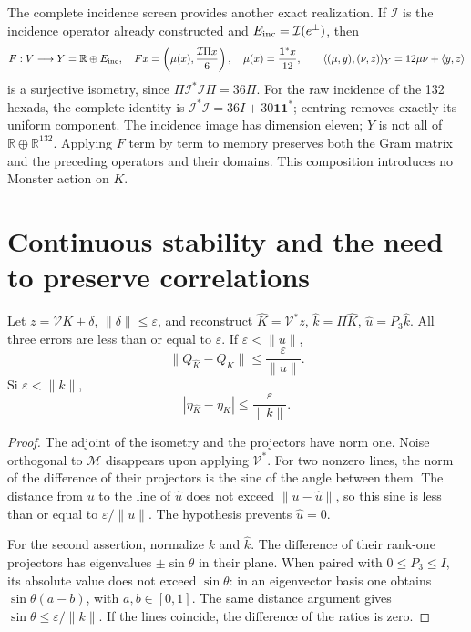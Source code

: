The complete incidence screen provides another exact realization. If \(\mathcal I\) is the incidence operator already constructed and \(E_{\rm inc}=\mathcal I(e^\perp)\), then
\begin{equation}
 F:V\longrightarrow Y=\mathbb R\oplus E_{\rm inc},\quad
 Fx=\left(\mu(x),\frac{\mathcal I\Pi x}{6}\right),\quad
 \mu(x)=\frac{\mathbf1^*x}{12},\qquad
 \langle(\mu,y),(\nu,z)\rangle_Y=12\mu\nu+\langle y,z\rangle
 \label{x_reciprocidad:lib01:incidencia-F}
\end{equation}
is a surjective isometry, since \(\Pi\mathcal I^*\mathcal I\Pi=36\Pi\). For the raw incidence of the 132 hexads, the complete identity is \(\mathcal I^*\mathcal I=36I+30\mathbf1\mathbf1^*\); centring removes exactly its uniform component. The incidence image has dimension eleven; \(Y\) is not all of \(\mathbb R\oplus\mathbb R^{132}\). Applying \(F\) term by term to memory preserves both the Gram matrix and the preceding operators and their domains. This composition introduces no Monster action on \(K\).

\section{Continuous stability and the need to preserve correlations}
\label{x_reciprocidad:lib01:ruido}

\begin{theorem}
\label{x_reciprocidad:lib01:error-proyectores}
Let \(z=\mathcal VK+\delta\), \(\|\delta\|\leq\varepsilon\), and reconstruct \(\widehat K=\mathcal V^*z\), \(\widehat k=\Pi\widehat K\), \(\widehat u=P_3\widehat k\). All three errors are less than or equal to \(\varepsilon\). If \(\varepsilon<\|u\|\),
\[
 \|Q_{\widehat K}-Q_K\|\leq\frac\varepsilon{\|u\|}.
\]
Si \(\varepsilon<\|k\|\),
\[
 |\eta_{\widehat K}-\eta_K|\leq\frac\varepsilon{\|k\|}.
\]
\end{theorem}
\begin{proof}
The adjoint of the isometry and the projectors have norm one. Noise orthogonal to \(\mathcal M\) disappears upon applying \(\mathcal V^*\). For two nonzero lines, the norm of the difference of their projectors is the sine of the angle between them. The distance from \(u\) to the line of \(\widehat u\) does not exceed \(\|u-\widehat u\|\), so this sine is less than or equal to \(\varepsilon/\|u\|\). The hypothesis prevents \(\widehat u=0\).

For the second assertion, normalize \(k\) and \(\widehat k\). The difference of their rank-one projectors has eigenvalues \(\pm\sin\theta\) in their plane. When paired with \(0\leq P_3\leq I\), its absolute value does not exceed \(\sin\theta\): in an eigenvector basis one obtains \(\sin\theta(a-b)\), with \(a,b\in[0,1]\). The same distance argument gives \(\sin\theta\leq\varepsilon/\|k\|\). If the lines coincide, the difference of the ratios is zero.
\end{proof}

